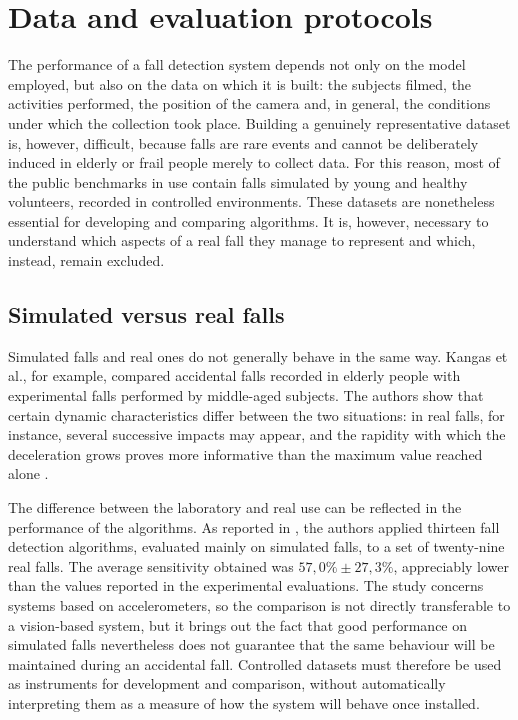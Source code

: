 \section{Data and evaluation protocols}

The performance of a fall detection system depends not only on the model employed, but also on the data on which it is built: the subjects filmed, the activities performed, the position of the camera and, in general, the conditions under which the collection took place.
Building a genuinely representative dataset is, however, difficult, because falls are rare events and cannot be deliberately induced in elderly or frail people merely to collect data. For this reason, most of the public benchmarks in use contain falls simulated by young and healthy volunteers, recorded in controlled environments.
These datasets are nonetheless essential for developing and comparing algorithms. It is, however, necessary to understand which aspects of a real fall they manage to represent and which, instead, remain excluded.

\subsection{Simulated versus real falls}

Simulated falls and real ones do not generally behave in the same way.
Kangas et al., for example, compared accidental falls recorded in elderly people with experimental falls performed by middle-aged subjects. The authors show that certain dynamic characteristics differ between the two situations: in real falls, for instance, several successive impacts may appear, and the rapidity with which the deceleration grows proves more informative than the maximum value reached alone \cite{KR}.

The difference between the laboratory and real use can be reflected in the performance of the algorithms. As reported in \cite{BA}, the authors applied thirteen fall detection algorithms, evaluated mainly on simulated falls, to a set of twenty-nine real falls. The average sensitivity obtained was \(57{,}0\% \pm 27{,}3\%\), appreciably lower than the values reported in the experimental evaluations. The study concerns systems based on accelerometers, so the comparison is not directly transferable to a vision-based system, but it brings out the fact that good performance on simulated falls nevertheless does not guarantee that the same behaviour will be maintained during an accidental fall.
Controlled datasets must therefore be used as instruments for development and comparison, without automatically interpreting them as a measure of how the system will behave once installed.

